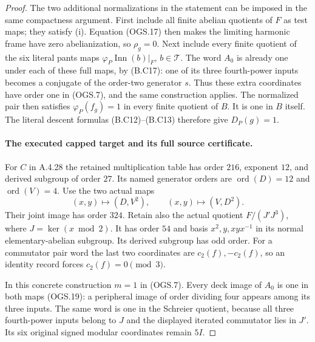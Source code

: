 \begin{proof}
The two additional normalizations in the statement
can be imposed in the same compactness argument.
First include all finite abelian quotients of $F$
as test maps; they satisfy (i).
Equation (OGS.17) then makes the limiting harmonic
frame have zero abelianization, so $\rho_g=0$.
Next include every finite quotient of the six
literal pants maps
$\varphi_P\operatorname{Inn}(b)|_F$, $b\in\mathcal T$.
The word $A_0$ is already one under each of these
full maps, by (B.C17): one of its three fourth-power
inputs becomes a conjugate of the order-two
generator $s$.
Thus these extra coordinates have order one in
(OGS.7), and the same construction applies.
The normalized pair then satisfies
$\varphi_P(f_g)=1$ in every finite quotient of $B$.
It is one in $B$ itself.
The literal descent formulas (B.C12)--(B.C13)
therefore give $D_P(g)=1$.

\paragraph{The executed capped target and its full source certificate.}
For $C$ in A.4.28 the retained multiplication table
has order $216$, exponent $12$, and derived subgroup
of order $27$.
Its named generator orders are
$\operatorname{ord}(D)=12$ and $\operatorname{ord}(V)=4$.
Use the two actual maps
\[
     (x,y)\mapsto(D,V^2),\qquad (x,y)\mapsto(V,D^2).
                                                               \tag{OGS.19}
\]
Their joint image has order $324$.
Retain also the actual quotient
$F/(J'J^3)$, where $J=\ker(x\bmod2)$.
It has order $54$ and basis $x^2,y,xyx^{-1}$ in
its normal elementary-abelian subgroup.
Its derived subgroup has odd order.
For a commutator pair word the last two coordinates
are $c_2(f),-c_2(f)$, so an identity record forces
$c_2(f)=0\pmod3$.

In this concrete construction $m=1$ in (OGS.7).
Every deck image of $A_0$ is one in both maps
(OGS.19): a peripheral image of order dividing
four appears among its three inputs.
The same word is one in the Schreier quotient,
because all three fourth-power inputs belong to
$J$ and the displayed iterated commutator lies
in $J'$.
Its six original signed modular coordinates
remain $5I$.


\end{proof}
